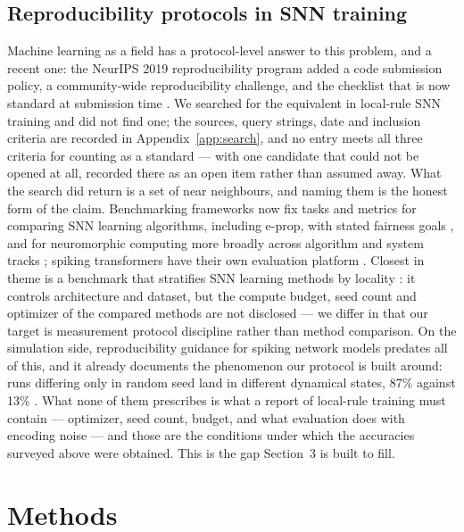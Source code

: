 \documentclass[11pt]{article}
\begin{document}
\subsection{Reproducibility protocols in SNN training}
Machine learning as a field has a protocol-level answer to this problem, and a
recent one: the NeurIPS 2019 reproducibility program added a code submission
policy, a community-wide reproducibility challenge, and the checklist that is now
standard at submission time \citep{pineau2021}. We searched for the equivalent in
local-rule SNN training and did not find one; the sources, query strings, date and
inclusion criteria are recorded in Appendix~\ref{app:search}, and no entry meets
all three criteria for counting as a standard --- with one candidate that could not
be opened at all, recorded there as an open item rather than assumed away. What
the search did return is a set
of near neighbours, and naming them is the honest form of the claim. Benchmarking
frameworks now fix tasks and metrics for comparing SNN learning algorithms,
including e-prop, with stated fairness goals \citep{neuroseqbench2025}, and for
neuromorphic computing more broadly across algorithm and system tracks
\citep{neurobench2023}; spiking transformers have their own evaluation platform
\citep{step2025}. Closest in theme is a benchmark that stratifies SNN learning
methods by locality \citep{benchmarks2024locality}: it controls architecture and
dataset, but the compute budget, seed count and optimizer of the compared methods
are not disclosed --- we differ in that our target is measurement protocol
discipline rather than method comparison. On the simulation side, reproducibility
guidance for spiking network models predates all of this, and it already documents
the phenomenon our protocol is built around: runs differing only in random seed
land in different dynamical states, 87\% against 13\% \citep{pauli2018reproducing}.
What none of them prescribes is what a report of local-rule training must contain
--- optimizer, seed count, budget, and what evaluation does with encoding noise
--- and those are the conditions under which the accuracies surveyed above were
obtained. This is the gap Section~3 is built to fill.

\section{Methods}
\end{document}
